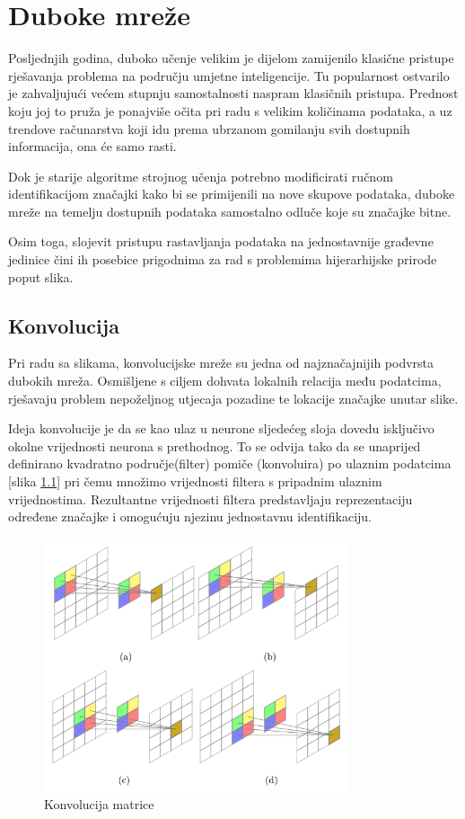 \documentclass[lmodern, utf8, seminar]{fer}
\begin{document}


\chapter{Duboke mreže}
Posljednjih godina, duboko učenje velikim je dijelom zamijenilo klasične pristupe rješavanja problema na području umjetne inteligencije. Tu popularnost ostvarilo je zahvaljujući većem stupnju samostalnosti naspram klasičnih pristupa. Prednost koju joj to pruža je ponajviše očita pri radu s velikim količinama podataka, a uz trendove računarstva koji idu prema ubrzanom gomilanju svih dostupnih informacija, ona će samo rasti.

Dok je starije algoritme strojnog učenja potrebno modificirati ručnom identifikacijom značajki kako bi se primijenili na nove skupove podataka, duboke mreže na temelju dostupnih podataka samostalno odluče koje su značajke bitne. 

Osim toga, slojevit pristupu rastavljanja podataka na jednostavnije građevne jedinice čini ih posebice prigodnima za rad s problemima hijerarhijske prirode poput slika. 
\newline


\section{Konvolucija}
Pri radu sa slikama, konvolucijske mreže su jedna od najznačajnijih podvrsta dubokih mreža. Osmišljene s ciljem dohvata lokalnih relacija među podatcima, rješavaju problem nepoželjnog utjecaja pozadine te lokacije značajke unutar slike. 

Ideja konvolucije je da se kao ulaz u neurone sljedećeg sloja dovedu isključivo okolne vrijednosti neurona s prethodnog. To se odvija tako da se unaprijed definirano kvadratno područje(filter) pomiče (konvoluira) po ulaznim podatcima  [slika \ref{fig:convolution}] pri čemu množimo vrijednosti filtera s pripadnim ulaznim vrijednostima. Rezultantne vrijednosti filtera predstavljaju reprezentaciju određene značajke i omogućuju njezinu jednostavnu identifikaciju.
\newline

\begin{figure}[H]
    \centering
    \includegraphics[width=0.8\textwidth]{convolution}
    \caption{Konvolucija matrice}
    \label{fig:convolution}
\end{figure}
\end{document}
